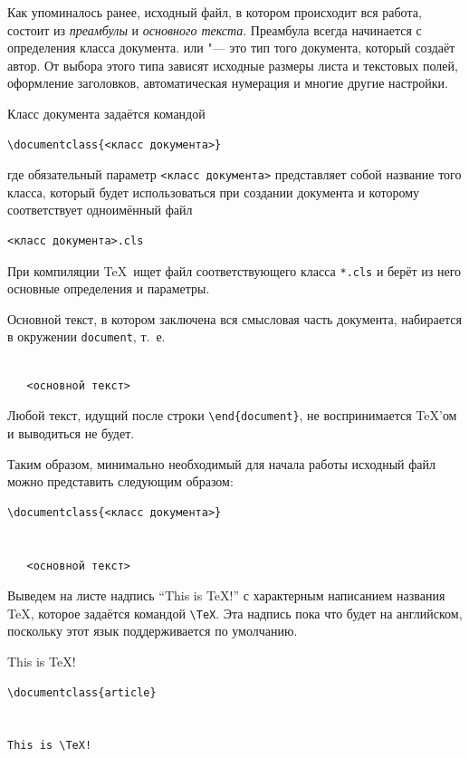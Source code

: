 Как упоминалось ранее, исходный файл, в котором происходит вся работа, состоит из \emph{преамбулы} и \emph{основного текста}. Преамбула всегда начинается с определения класса документа.  или  "--- это тип того документа, который создаёт автор. От выбора этого типа зависят исходные размеры листа и текстовых полей, оформление заголовков, автоматическая нумерация и многие другие настройки.

Класс документа задаётся командой
\begin{verbatim}
\documentclass{<класс документа>}
\end{verbatim}
где обязательный параметр \verb|<класс документа>| представляет собой название того класса, который будет использоваться при создании документа и которому соответствует одноимённый файл
\begin{verbatim}
<класс документа>.cls
\end{verbatim}
При компиляции \TeX\ ищет файл соответствующего класса \verb|*.cls| и берёт из него основные определения и параметры. 

Основной текст, в котором заключена вся смысловая часть документа, набирается в окружении \texttt{document}, т.~е.
\begin{verbatim}

   <основной текст>

\end{verbatim}

\begin{note}
Любой текст, идущий после строки \texttt{\textbackslash end\{document\}}, не воспринимается \TeX'ом и выводиться не будет.
\end{note}

Таким образом, минимально необходимый для начала работы исходный файл можно представить следующим образом:
\begin{verbatim}
\documentclass{<класс документа>}


   <основной текст>

\end{verbatim}

Выведем на листе надпись ``This is \TeX!'' с характерным написанием названия \TeX{}, которое задаётся командой \verb|\TeX|. Эта надпись пока что будет на английском, поскольку этот язык поддерживается по умолчанию.
\begin{example}
This is \TeX!
\end{example}
\begin{release}
\begin{verbatim}
\documentclass{article}


This is \TeX!

\end{verbatim}
\end{release}

